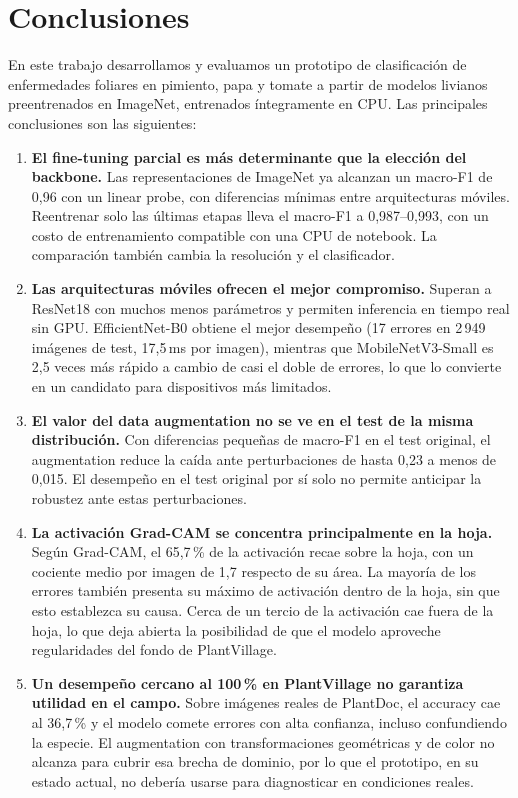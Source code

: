 \section{Conclusiones}
\label{sec:conclusiones}

En este trabajo desarrollamos y evaluamos un prototipo de clasificación de enfermedades
foliares en pimiento, papa y tomate a partir de modelos livianos preentrenados en ImageNet,
entrenados íntegramente en CPU. Las principales conclusiones son las siguientes:

\begin{enumerate}
  \item \textbf{El fine-tuning parcial es más determinante que la elección del backbone.} Las
        representaciones de ImageNet ya alcanzan un macro-F1 de 0,96 con un linear probe,
        con diferencias mínimas entre arquitecturas móviles. Reentrenar solo las últimas
        etapas lleva el macro-F1 a 0,987--0,993, con un costo de entrenamiento compatible con
        una CPU de notebook. La comparación también cambia la resolución y el clasificador.
  \item \textbf{Las arquitecturas móviles ofrecen el mejor compromiso.} Superan a ResNet18
        con muchos menos parámetros y permiten inferencia en tiempo real sin GPU.
        EfficientNet-B0 obtiene el mejor desempeño (17 errores en 2\,949 imágenes de test,
        17,5\,ms por imagen), mientras que MobileNetV3-Small es 2,5 veces más rápido a cambio
        de casi el doble de errores, lo que lo convierte en un candidato para dispositivos más limitados.
  \item \textbf{El valor del data augmentation no se ve en el test de la misma distribución.}
        Con diferencias pequeñas de macro-F1 en el test original, el augmentation reduce la caída ante
        perturbaciones de hasta 0,23 a menos de 0,015. El desempeño en el test original por sí
        solo no permite anticipar la robustez ante estas perturbaciones.
  \item \textbf{La activación Grad-CAM se concentra principalmente en la hoja.} Según
        Grad-CAM, el 65,7\,\% de la activación recae sobre la hoja, con un cociente medio por
        imagen de 1,7 respecto de su área. La mayoría de los errores también presenta su
        máximo de activación dentro de la hoja, sin que esto establezca su causa. Cerca de un tercio de la activación
        cae fuera de la hoja, lo que deja abierta la posibilidad de que el modelo aproveche
        regularidades del fondo de PlantVillage.
  \item \textbf{Un desempeño cercano al 100\,\% en PlantVillage no garantiza utilidad en el
        campo.} Sobre imágenes reales de PlantDoc, el accuracy cae al 36,7\,\% y el modelo
        comete errores con alta confianza, incluso confundiendo la especie. El augmentation
        con transformaciones geométricas y de color no alcanza para cubrir esa brecha de
        dominio, por lo que el prototipo, en su estado actual, no debería usarse para
        diagnosticar en condiciones reales.
\end{enumerate}

